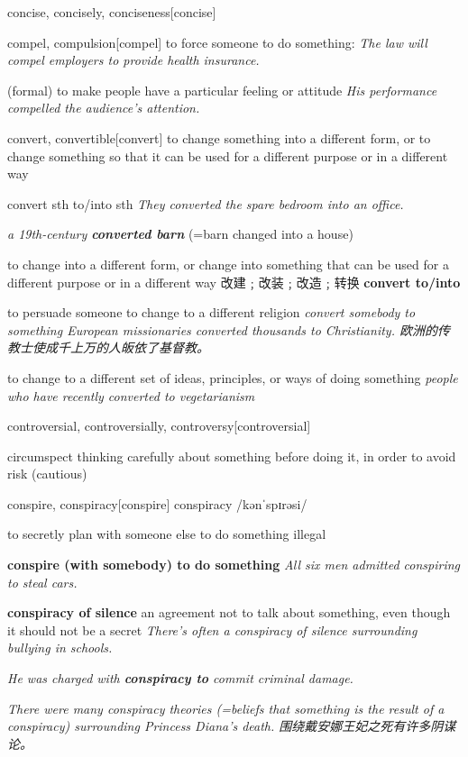 \begin{word}{concise, concisely, conciseness}[concise] 
\end{word}

\begin{word}{compel,  compulsion}[compel]
    to force someone to do something:
    \textit{The law will compel employers to provide health insurance.}

    (formal) to make people have a particular feeling or attitude
    \textit{His performance compelled the audience’s attention.}
\end{word}

\begin{word}{convert, convertible}[convert]
    to change something into a different form, or to change something so that it can be used for a different purpose or in a different way

    convert sth to/into sth
    \textit{They converted the spare bedroom into an office.}

    \textit{a 19th-century \textbf{converted barn}} (=barn changed into a house)

    to change into a different form, or change into something that can be used for a different purpose or in a different way 改建﹔改装﹔改造﹔转换
    \textbf{convert to/into}

    to persuade someone to change to a different religion
    \textit{convert somebody to something
    European missionaries converted thousands to Christianity. 欧洲的传教士使成千上万的人皈依了基督教。}

    to change to a different set of ideas, principles, or ways of doing something
    \textit{people who have recently converted to vegetarianism}
\end{word}

\begin{word}{controversial, controversially, controversy}[controversial]
\end{word}

\begin{word}{circumspect}
    thinking carefully about something before doing it, in order to avoid risk (cautious)
\end{word}

\begin{word}{conspire, conspiracy}[conspire]
    conspiracy /kənˈspɪrəsi/

    to secretly plan with someone else to do something illegal

    \textbf{conspire (with somebody) to do something}
    \textit{All six men admitted conspiring to steal cars.}

    \textbf{conspiracy of silence} an agreement not to talk about something, even though it should not be a secret
    \textit{There’s often a conspiracy of silence surrounding bullying in schools.}

    \textit{He was charged with \textbf{conspiracy to} commit criminal damage.}

    \textit{There were many conspiracy theories (=beliefs that something is the result of a conspiracy) surrounding Princess Diana’s death. 围绕戴安娜王妃之死有许多阴谋论。}
\end{word}